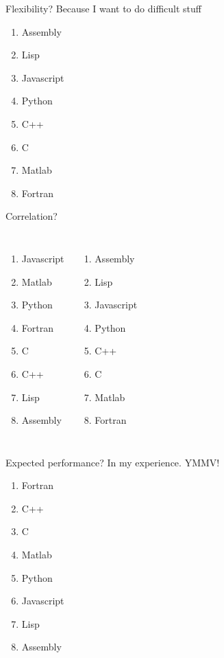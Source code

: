 \documentclass[20pt]{beamer}
\begin{document}
\begin{frame}{Flexibility?}
  Because I want to do difficult stuff
  \begin{multicols}{2}
    \begin{enumerate}
    \item Assembly
    \item Lisp
    \item Javascript
    \item Python
    \item C++
    \item C
    \item Matlab
    \item Fortran
    \end{enumerate}
  \end{multicols}
\end{frame}

\begin{frame}{Correlation?}
  \begin{columns}
    \begin{enumerate}
    \item Javascript
    \item Matlab
    \item Python
    \item Fortran
    \item C
    \item C++
    \item Lisp
    \item Assembly
    \end{enumerate}
    \begin{enumerate}
    \item Assembly
    \item Lisp
    \item Javascript
    \item Python
    \item C++
    \item C
    \item Matlab
    \item Fortran
    \end{enumerate}
  \end{columns}
\end{frame}

\begin{frame}{Expected performance?}
  In my experience. YMMV!
  \begin{multicols}{2}
    \begin{enumerate}
    \item Fortran
    \item C++
    \item C
    \item Matlab
    \item Python
    \item Javascript
    \item Lisp
    \item Assembly
    \end{enumerate}
  \end{multicols}
\end{frame}
\end{document}
